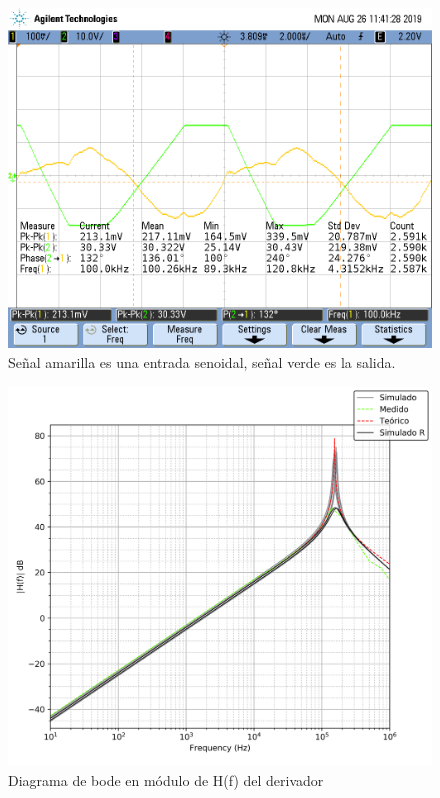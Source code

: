 \begin{figure}[H]
	\centering
	\includegraphics[scale=0.4]{Derivador/Mediciones/Osciloscopio/Justificacion/scope_4.png}
	\caption{Señal amarilla es una entrada senoidal, señal verde es la salida.}
	\label{fig:justificacion_derivador}
\end{figure}

\begin{figure}[H]
	\centering
	\includegraphics[scale=0.6]{Recursos/Derivador/bode_modulo_correcion.png}
	\caption{Diagrama de bode en m\'odulo de H(f) del derivador}
	\label{fig:derivador_bode_modulo}
\end{figure}

